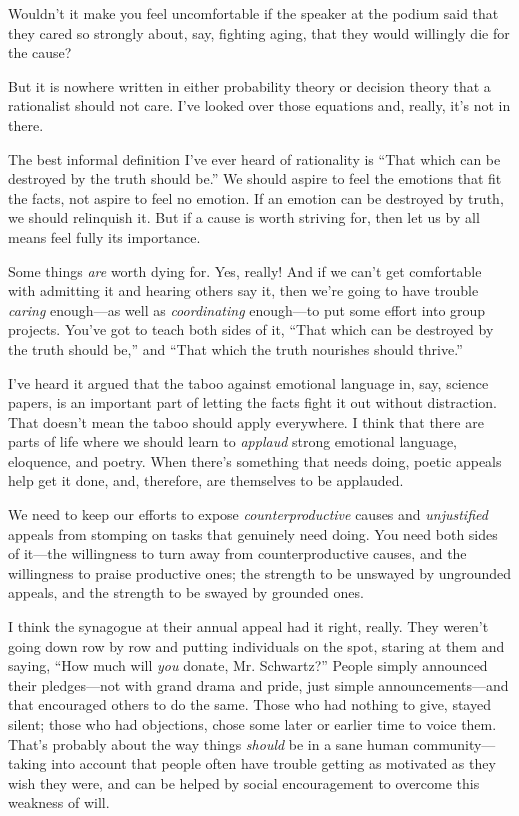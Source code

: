 {
 Wouldn't it make you feel uncomfortable if the
speaker at the podium said that they cared so strongly about, say,
fighting aging, that they would willingly die for the cause?}

{
 But it is nowhere written in either probability theory or decision
theory that a rationalist should not care. I've looked
over those equations and, really, it's not in there.}

{
 The best informal definition I've ever heard of
rationality is ``That which can be destroyed by the
truth should be.'' We should aspire to feel the
emotions that fit the facts, not aspire to feel no emotion. If an
emotion can be destroyed by truth, we should relinquish it. But if a
cause is worth striving for, then let us by all means feel fully its
importance.}

{
 Some things \textit{are} worth dying for. Yes, really! And if we
can't get comfortable with admitting it and hearing
others say it, then we're going to have trouble
\textit{caring} enough---as well as \textit{coordinating} enough---to
put some effort into group projects. You've got to
teach both sides of it, ``That which can be destroyed
by the truth should be,'' and ``That
which the truth nourishes should thrive.''}

{
 I've heard it argued that the taboo against
emotional language in, say, science papers, is an important part of
letting the facts fight it out without distraction. That
doesn't mean the taboo should apply everywhere. I think
that there are parts of life where we should learn to \textit{applaud}
strong emotional language, eloquence, and poetry. When
there's something that needs doing, poetic appeals help
get it done, and, therefore, are themselves to be applauded.}

{
 We need to keep our efforts to expose \textit{counterproductive}
causes and \textit{unjustified} appeals from stomping on tasks that
genuinely need doing. You need both sides of it---the willingness to
turn away from counterproductive causes, and the willingness to praise
productive ones; the strength to be unswayed by ungrounded appeals, and
the strength to be swayed by grounded ones.}

{
 I think the synagogue at their annual appeal had it right, really.
They weren't going down row by row and putting
individuals on the spot, staring at them and saying,
``How much will \textit{you} donate, Mr.
Schwartz?'' People simply announced their
pledges---not with grand drama and pride, just simple
announcements---and that encouraged others to do the same. Those who
had nothing to give, stayed silent; those who had objections, chose
some later or earlier time to voice them. That's
probably about the way things \textit{should} be in a sane human
community---taking into account that people often have trouble getting
as motivated as they wish they were, and can be helped by social
encouragement to overcome this weakness of will.}

